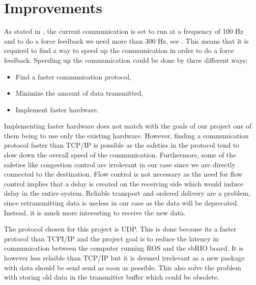 \chapter{Improvements}\label{sec:improvements}
As stated in , the current communication is set to run at a frequency of 100 Hz and to do a force feedback we need more than 300 Hz, see . This means that it is required to find a way to speed up the communication in order to do a force feedback. Speeding up the communication could be done by three different ways:

\begin{itemize}
	\item Find a faster communication protocol,
	\item Minimize the amount of data transmitted,
	\item Implement faster hardware.	
\end{itemize}

Implementing faster hardware does not match with the goals of our project one of them being to use only the existing hardware.
However, finding a communication protocol faster than TCP/IP is possible as the safeties in the protocol tend to slow down the overall speed of the communication. Furthermore, some of the safeties like congestion control are irrelevant in our case since we are directly connected to the destination. Flow control is not necessary as the need for flow control implies that a delay is created on the receiving side which would induce delay in the entire system. Reliable transport and ordered delivery are a problem, since retransmitting data is useless in our case as the data will be deprecated. Instead, it is much more interesting to receive the new data. 

The protocol chosen for this project is \gls{UDP}. This is done because its a faster protocol than TCPI/IP and the project goal is to reduce the latency in communication between the computer running ROS and the sbRIO board. It is however less relaible than TCP/IP but it is deemed irrelevant as a new package with data should be send send as soon as possible. This also solve the problem with storing old data in the transmitter buffer which could be obsolete.






